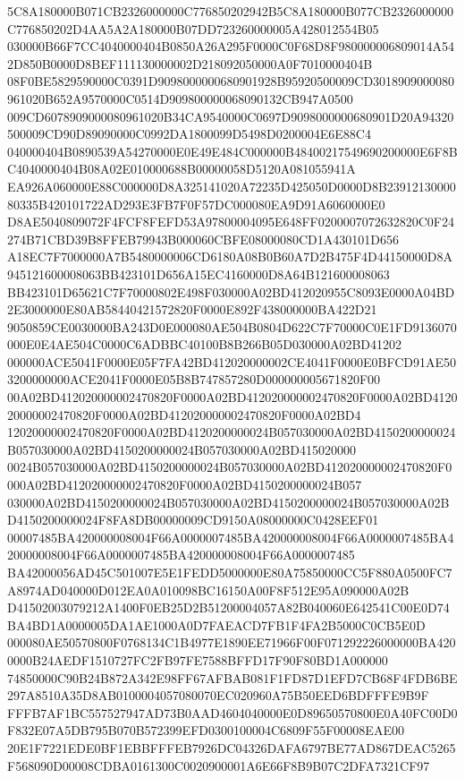 \documentclass[UTF8,fontset=fandol,zihao=-4,a4paper]{ctexart}
\begin{document}
{{5C8A180000B071CB2326000000C776850202942B5C8A180000B077CB2326000000C776850202D4AA5A2A180000B07DD723260000005A428012554B05
030000B66F7CC4040000404B0850A26A295F0000C0F68D8F980000006809014A542D850B0000D8BEF111130000002D218092050000A0F7010000404B
08F0BE5829590000C0391D9098000000680901928B95920500009CD3018909000080961020B652A9570000C0514D909800000068090132CB947A0500
009CD6078909000080961020B34CA9540000C0697D9098000000680901D20A94320500009CD90D89090000C0992DA1800099D5498D0200004E6E88C4
040000404B0890539A54270000E0E49E484C000000B48400217549690200000E6F8BC4040000404B08A02E010000688B00000058D5120A081055941A
EA926A060000E88C000000D8A325141020A72235D425050D0000D8B2391213000080335B420101722AD293E3FB7F0F57DC000080EA9D91A6060000E0
D8AE5040809072F4FCF8FEFD53A97800004095E648FF0200007072632820C0F24274B71CBD39B8FFEB79943B000060CBFE08000080CD1A430101D656
A18EC7F7000000A7B5480000006CD6180A08B0B60A7D2B475F4D44150000D8A945121600008063BB423101D656A15EC4160000D8A64B121600008063
BB423101D65621C7F70000802E498F030000A02BD412020955C8093E0000A04BD2E3000000E80AB58440421572820F0000E892F438000000BA422D21
9050859CE0030000BA243D0E000080AE504B0804D622C7F70000C0E1FD9136070000E0E4AE504C0000C6ADBBC40100B8B266B05D030000A02BD41202
000000ACE5041F0000E05F7FA42BD412020000002CE4041F0000E0BFCD91AE503200000000ACE2041F0000E05B8B747857280D000000005671820F00
00A02BD412020000002470820F0000A02BD412020000002470820F0000A02BD412020000002470820F0000A02BD412020000002470820F0000A02BD4
12020000002470820F0000A02BD4120200000024B057030000A02BD4150200000024B057030000A02BD4150200000024B057030000A02BD415020000
0024B057030000A02BD4150200000024B057030000A02BD412020000002470820F0000A02BD412020000002470820F0000A02BD4150200000024B057
030000A02BD4150200000024B057030000A02BD4150200000024B057030000A02BD4150200000024F8FA8DB00000009CD9150A08000000C0428EEF01
00007485BA420000008004F66A0000007485BA420000008004F66A0000007485BA420000008004F66A0000007485BA420000008004F66A0000007485
BA42000056AD45C501007E5E1FEDD5000000E80A75850000CC5F880A0500FC7A8974AD040000D012EA0A010098BC16150A00F8F512E95A090000A02B
D41502003079212A1400F0EB25D2B51200004057A82B040060E642541C00E0D74BA4BD1A0000005DA1AE1000A0D7FAEACD7FB1F4FA2B5000C0CB5E0D
000080AE50570800F0768134C1B4977E1890EE71966F00F071292226000000BA4200000B24AEDF1510727FC2FB97FE7588BFFD17F90F80BD1A000000
74850000C90B24B872A342E98FF67AFBAB081F1FD87D1EFD7CB68F4FDB6BE297A8510A35D8AB0100004057080070EC020960A75B50EED6BDFFFE9B9F
FFFB7AF1BC557527947AD73B0AAD4604040000E0D89650570800E0A40FC00D0F832E07A5DB795B070B572399EFD0300100004C6809F55F00008EAE00
20E1F7221EDE0BF1EBBFFFEB7926DC04326DAFA6797BE77AD867DEAC5265F568090D00008CDBA0161300C0020900001A6E66F8B9B07C2DFA7321CF97
}}
\end{document}
